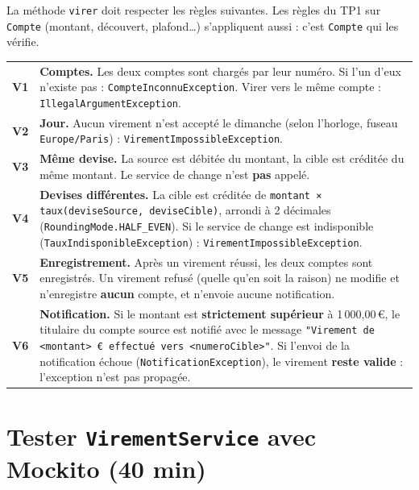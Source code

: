 \documentclass[11pt]{article}
\begin{document}
La méthode \texttt{virer} doit respecter les règles suivantes. Les règles du TP1 sur \texttt{Compte} (montant, découvert, plafond\ldots) s'appliquent aussi : c'est \texttt{Compte} qui les vérifie.

\begin{center}
\renewcommand{\arraystretch}{1.3}
\begin{tabular}{@{}>{\bfseries\color{qaaccentdark}}l >{\raggedright\arraybackslash}p{14cm}@{}}
\toprule
V1 & \textbf{Comptes.} Les deux comptes sont chargés par leur numéro. Si l'un d'eux n'existe pas : \texttt{CompteInconnuException}. Virer vers le même compte : \texttt{IllegalArgumentException}. \\
V2 & \textbf{Jour.} Aucun virement n'est accepté le dimanche (selon l'horloge, fuseau \texttt{Europe/Paris}) : \texttt{VirementImpossibleException}. \\
V3 & \textbf{Même devise.} La source est débitée du montant, la cible est créditée du même montant. Le service de change n'est \textbf{pas} appelé. \\
V4 & \textbf{Devises différentes.} La cible est créditée de \texttt{montant × taux(deviseSource, deviseCible)}, arrondi à 2 décimales (\texttt{RoundingMode.HALF\_EVEN}). Si le service de change est indisponible (\texttt{TauxIndisponibleException}) : \texttt{VirementImpossibleException}. \\
V5 & \textbf{Enregistrement.} Après un virement réussi, les deux comptes sont enregistrés. Un virement refusé (quelle qu'en soit la raison) ne modifie et n'enregistre \textbf{aucun} compte, et n'envoie aucune notification. \\
V6 & \textbf{Notification.} Si le montant est \textbf{strictement supérieur} à 1\,000,00\,\euro{}, le titulaire du compte source est notifié avec le message \texttt{"Virement de <montant> € effectué vers <numeroCible>"}. Si l'envoi de la notification échoue (\texttt{NotificationException}), le virement \textbf{reste valide} : l'exception n'est pas propagée. \\
\bottomrule
\end{tabular}
\end{center}

\section{Tester \texttt{VirementService} avec Mockito (40 min)}
\end{document}
